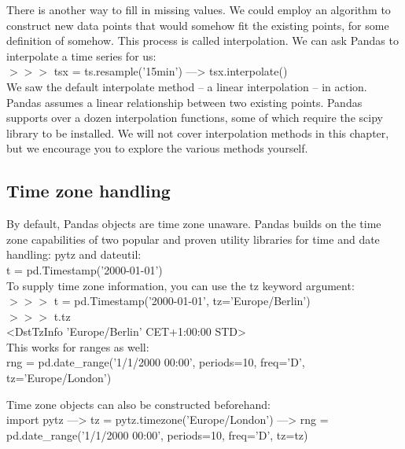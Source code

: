 \documentclass{article}
\numberwithin{equation}{section} %
\begin{document}
There is another way to fill in missing values. We could employ an algorithm to construct new data points that would somehow fit the existing points, for some definition of somehow. This process is called interpolation. We can ask Pandas to interpolate a time series for us: \\

$>>>$ tsx = ts.resample('15min') ---> tsx.interpolate() \\

We saw the default interpolate method – a linear interpolation – in action. Pandas assumes a linear relationship between two existing points. Pandas supports over a dozen interpolation functions, some of which require the scipy library to be installed. We will not cover interpolation methods in this chapter, but we encourage you to explore the various methods yourself. \\

\subsection*{Time zone handling}

By default, Pandas objects are time zone unaware. Pandas builds on the time zone capabilities of two popular and proven utility libraries for time and date handling: pytz and dateutil: \\

t = pd.Timestamp('2000-01-01') \\

To supply time zone information, you can use the tz keyword argument: \\

$>>>$ t = pd.Timestamp('2000-01-01', tz='Europe/Berlin') \\

$>>>$ t.tz\\
<DstTzInfo 'Europe/Berlin' CET+1:00:00 STD> \\

This works for ranges as well: \\

rng = pd.date\_range('1/1/2000 00:00', periods=10, freq='D', tz='Europe/London')

Time zone objects can also be constructed beforehand: \\

import pytz ---> tz = pytz.timezone('Europe/London') ---> rng = pd.date\_range('1/1/2000 00:00', periods=10, freq='D', tz=tz) \\
\end{document}
